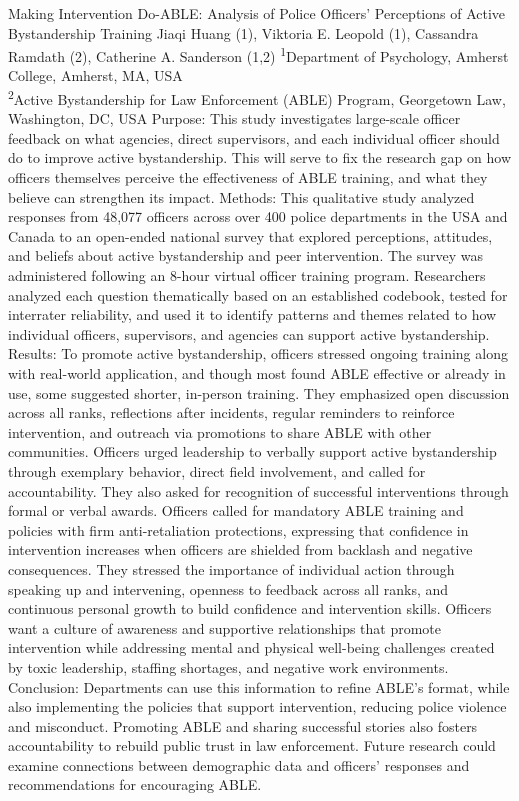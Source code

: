 \makeabstract
{
Making Intervention Do-ABLE: Analysis of Police Officers’ Perceptions of Active Bystandership Training
}
{
Jiaqi Huang (1), Viktoria E. Leopold (1), Cassandra Ramdath (2), Catherine A. Sanderson (1,2)
}
{
\textsuperscript{1}Department of Psychology, Amherst College, Amherst, MA, USA\\
\textsuperscript{2}Active Bystandership for Law Enforcement (ABLE) Program, Georgetown Law, Washington, DC, USA
}
{
Purpose: 
This study investigates large-scale officer feedback on what agencies, direct supervisors, and each individual officer should do to improve active bystandership. This will serve to fix the research gap on how officers themselves perceive the effectiveness of ABLE training, and what they believe can strengthen its impact.
}
{
Methods:
This qualitative study analyzed responses from 48,077 officers across over 400 police departments in the USA and Canada to an open-ended national survey that explored perceptions, attitudes, and beliefs about active bystandership and peer intervention. The survey was administered following an 8-hour virtual officer training program. Researchers analyzed each question thematically based on an established codebook, tested for interrater reliability, and used it to identify patterns and themes related to how individual officers, supervisors, and agencies can support active bystandership.
}
{
Results:
To promote active bystandership, officers stressed ongoing training along with real-world application, and though most found ABLE effective or already in use, some suggested shorter, in-person training. They emphasized open discussion across all ranks, reflections after incidents, regular reminders to reinforce intervention, and outreach via promotions to share ABLE with other communities. Officers urged leadership to verbally support active bystandership through exemplary behavior, direct field involvement, and called for accountability. They also asked for recognition of successful interventions through formal or verbal awards. Officers called for mandatory ABLE training and policies with firm anti-retaliation protections, expressing that confidence in intervention increases when officers are shielded from backlash and negative consequences. They stressed the importance of individual action through speaking up and intervening, openness to feedback across all ranks, and continuous personal growth to build confidence and intervention skills. Officers want a culture of awareness and supportive relationships that promote intervention while addressing mental and physical well-being challenges created by toxic leadership, staffing shortages, and negative work environments.
}
{
Conclusion:
Departments can use this information to refine ABLE’s format, while also implementing the policies that support intervention, reducing police violence and misconduct. Promoting ABLE and sharing successful stories also fosters accountability to rebuild public trust in law enforcement. Future research could examine connections between demographic data and officers’ responses and recommendations for encouraging ABLE. 
}

\newpage
